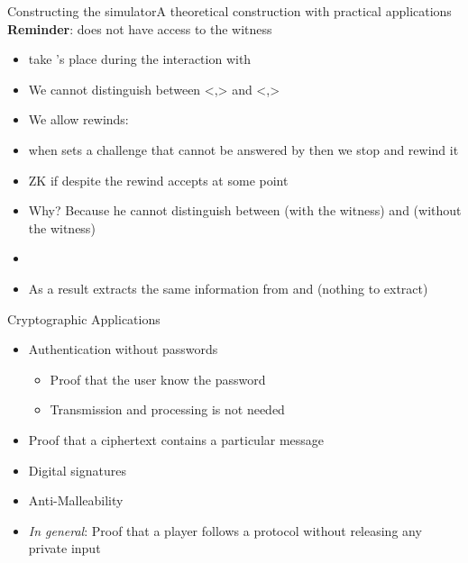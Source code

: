 \documentclass[handout]{beamer}
\begin{document}
\begin{frame}{Constructing the simulator}{A theoretical construction with practical applications}
\textbf{Reminder}: \siml does not have access to the witness
\pause
\begin{small}
\begin{itemize}
\setlength\itemsep{0.01em}
\item \siml take \prv's place during the interaction with \ver 
\pause
\item We cannot distinguish between <\siml,\ver> and <\prv,\ver>
\pause
\item We allow rewinds:
\pause
\item when \ver sets a challenge that cannot be answered by \siml then we stop and rewind it
\pause
\item ZK if despite the rewind \ver accepts at some point
\pause
\item Why? \pause
Because he cannot distinguish between \prv (with the witness) and \siml (without the witness) 
\pause
\item {}
\pause
\item As a result \ver extracts the same information from \prv and \siml (nothing to extract)

\end{itemize}
\end{small}
\end{frame}

\begin{frame}{Cryptographic Applications}
\begin{itemize}
\item Authentication without passwords
\begin{itemize}
\item Proof that the user know the password
\item Transmission and processing is not needed
\end{itemize}
\pause
\item Proof that a ciphertext contains a particular message
\pause
\item Digital signatures
\item Anti-Malleability
\pause 
\item \emph{In general}: Proof that a player follows a protocol without releasing any private input
\end{itemize}
\end{frame}
\end{document}
